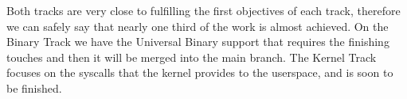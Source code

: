
Both tracks are very close to fulfilling the first objectives of each track,
therefore we can safely say that nearly one third of the work is almost
achieved. On the Binary Track we have the Universal Binary support that
requires the finishing touches and then it will be merged into the main
branch. The Kernel Track focuses on the syscalls that the kernel provides to
the userspace, and is soon to be finished.
